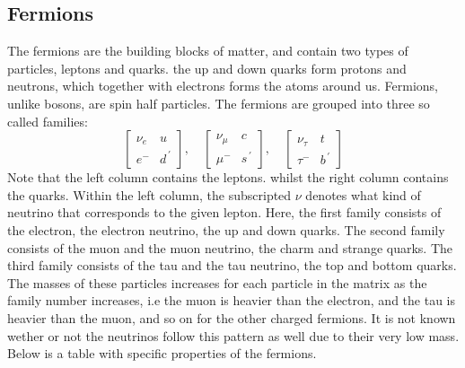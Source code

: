 \subsection*{Fermions}
The fermions are the building blocks of matter, and contain two types of particles, leptons and quarks. the up and down quarks form protons and neutrons, which together with electrons forms the atoms around us.
Fermions, unlike bosons, are spin half particles.  The fermions are grouped into three so called families:
\begin{equation*}
    \begin{bmatrix}
        \nu_e & u \\
        e^{-} & d^{\, '} 
    \end{bmatrix},\quad
    \begin{bmatrix}
        \nu_{\mu} & c \\
        \mu^{-} & s^{\, '}
    \end{bmatrix},\quad
    \begin{bmatrix}
        \nu_{\tau} & t \\
        \tau^{-} & b^{\, '}
    \end{bmatrix}
\end{equation*}
Note that the left column contains the leptons. whilst the right column contains the quarks. Within the left column, the subscripted $\nu$ denotes what kind of neutrino that corresponds 
to the given lepton. Here, the first family consists of the electron, the electron neutrino, the up and down quarks. The second family consists of the muon and the
muon neutrino, the charm and strange quarks. The third family consists of the tau and the tau neutrino, the top and bottom quarks. The masses of these particles 
increases for each particle in the matrix as the family number increases, i.e the muon is heavier than the electron, and the tau is heavier than the muon, and so 
on for the other charged fermions. It is not known wether or not the neutrinos follow this pattern as well due to their very low mass. Below is a table with specific properties of the fermions.\par

